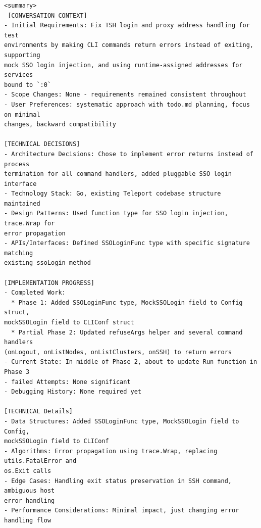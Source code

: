 \begin{tcolorbox}[colback=white,  %
                   colframe=black,    %
                   coltext=metablue,      %
                   breakable,
                   fontupper=\scriptsize\fontfamily{pcr}\selectfont]  %
\begin{verbatim}
<summary>
 [CONVERSATION CONTEXT]
- Initial Requirements: Fix TSH login and proxy address handling for test 
environments by making CLI commands return errors instead of exiting, supporting
mock SSO login injection, and using runtime-assigned addresses for services 
bound to `:0`
- Scope Changes: None - requirements remained consistent throughout
- User Preferences: systematic approach with todo.md planning, focus on minimal 
changes, backward compatibility

[TECHNICAL DECISIONS]
- Architecture Decisions: Chose to implement error returns instead of process 
termination for all command handlers, added pluggable SSO login interface
- Technology Stack: Go, existing Teleport codebase structure maintained
- Design Patterns: Used function type for SSO login injection, trace.Wrap for 
error propagation
- APIs/Interfaces: Defined SSOLoginFunc type with specific signature matching 
existing ssoLogin method

[IMPLEMENTATION PROGRESS]
- Completed Work: 
  * Phase 1: Added SSOLoginFunc type, MockSSOLogin field to Config struct, 
mockSSOLogin field to CLIConf struct
  * Partial Phase 2: Updated refuseArgs helper and several command handlers 
(onLogout, onListNodes, onListClusters, onSSH) to return errors
- Current State: In middle of Phase 2, about to update Run function in Phase 3
- failed Attempts: None significant
- Debugging History: None required yet

[TECHNICAL Details]
- Data Structures: Added SSOLoginFunc type, MockSSOLogin field to Config, 
mockSSOLogin field to CLIConf
- Algorithms: Error propagation using trace.Wrap, replacing utils.FatalError and
os.Exit calls
- Edge Cases: Handling exit status preservation in SSH command, ambiguous host 
error handling
- Performance Considerations: Minimal impact, just changing error handling flow


\end{verbatim}
\end{tcolorbox}
